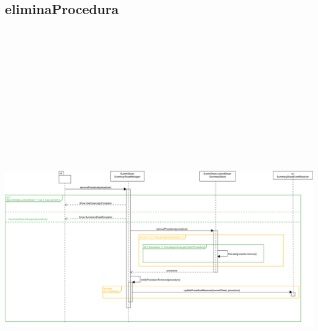 \subsection{eliminaProcedura}
\centering\includegraphics[max width=\textwidth, max height=190mm]{../resources/img/GCC/DSD/op2a.png}

